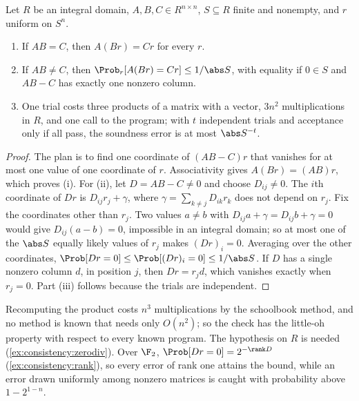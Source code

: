 \begin{refsection}
\begin{theorem}\label{thm:consistency:freivalds}
Let $R$ be an integral domain, $A,B,C\in R^{n\times n}$, $S\subseteq R$ finite and nonempty, and $r$ uniform on $S^n$.
\begin{enumerate}
\item If $AB=C$, then $A(Br)=Cr$ for every $r$.
\item If $AB\ne C$, then $\Prob_r[A(Br)=Cr]\le1/\abs S$, with equality if $0\in S$ and $AB-C$ has exactly one nonzero column.
\item One trial costs three products of a matrix with a vector, $3n^2$ multiplications in $R$, and one call to the program; with $t$ independent trials and acceptance only if all pass, the soundness error is at most $\abs S^{-t}$.
\end{enumerate}
\end{theorem}

\begin{proof}
The plan is to find one coordinate of $(AB-C)r$ that vanishes for at most one value of one coordinate of $r$. Associativity gives $A(Br)=(AB)r$, which proves (i). For (ii), let $D=AB-C\ne0$ and choose $D_{ij}\ne0$. The $i$th coordinate of $Dr$ is $D_{ij}r_j+\gamma$, where $\gamma=\sum_{k\ne j}D_{ik}r_k$ does not depend on $r_j$. Fix the coordinates other than $r_j$. Two values $a\ne b$ with $D_{ij}a+\gamma=D_{ij}b+\gamma=0$ would give $D_{ij}(a-b)=0$, impossible in an integral domain; so at most one of the $\abs S$ equally likely values of $r_j$ makes $(Dr)_i=0$. Averaging over the other coordinates, $\Prob[Dr=0]\le\Prob[(Dr)_i=0]\le1/\abs S$. If $D$ has a single nonzero column $d$, in position $j$, then $Dr=r_jd$, which vanishes exactly when $r_j=0$. Part (iii) follows because the trials are independent.
\end{proof}

Recomputing the product costs $n^3$ multiplications by the schoolbook method, and no method is known that needs only $O(n^2)$; so the check has the little-oh property with respect to every known program. The hypothesis on $R$ is needed (\cref{ex:consistency:zerodiv}). Over $\F_2$, $\Prob[Dr=0]=2^{-\rank D}$ (\cref{ex:consistency:rank}), so every error of rank one attains the bound, while an error drawn uniformly among nonzero matrices is caught with probability above $1-2^{1-n}$.


\end{refsection}
